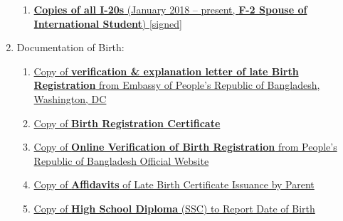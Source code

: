 \begin{enumerate}[label=\textbf{ Exhibit-\arabic*},start=15]
\begin{enumerate}[label=\roman*.]
    \item \hyperref[exhibit6e]{\textbf{Copies of all I-20s} (January 2018 – present, \textbf{F-2 Spouse of International Student}) [signed]}
    
    \end{enumerate}

    \item Documentation of Birth:
    \begin{enumerate}[label=\roman*.]
        \item \hyperref[exhibit5a]{Copy of \textbf{verification \& explanation letter of late Birth Registration} from Embassy of People's Republic of Bangladesh, Washington, DC}
        \item \hyperref[exhibit5b]{Copy of \textbf{Birth Registration Certificate}}
        \item \hyperref[exhibit5c]{Copy of \textbf{Online Verification of Birth Registration} from People's Republic of Bangladesh Official Website}
        \item \hyperref[exhibit5d]{Copy of \textbf{Affidavits} of Late Birth Certificate Issuance by Parent}
        \item \hyperref[exhibit5e]{Copy of \textbf{High School Diploma} (SSC) to Report Date of Birth}
    \end{enumerate}
    
    
    

\end{enumerate}
